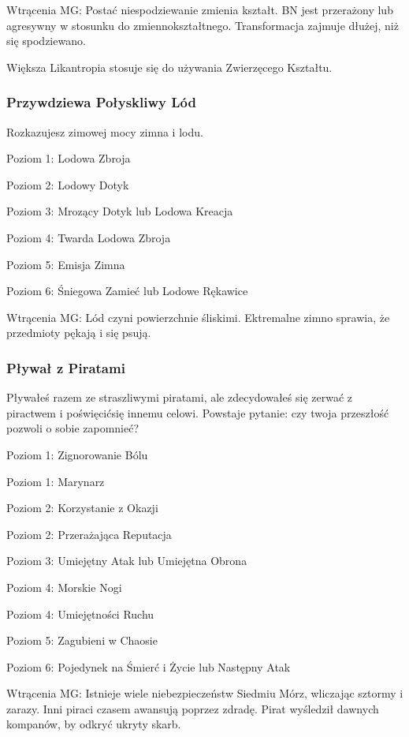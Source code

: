 Wtrącenia MG: Postać niespodziewanie zmienia kształt. BN jest przerażony lub agresywny w stosunku do zmiennokształtnego. Transformacja zajmuje dłużej, niż się spodziewano.

Większa Likantropia stosuje się do używania Zwierzęcego Kształtu.

\subsubsection{Przywdziewa Połyskliwy Lód}

Rozkazujesz zimowej mocy zimna i lodu.

Poziom 1: Lodowa Zbroja

Poziom 2: Lodowy Dotyk

Poziom 3: Mrozący Dotyk lub Lodowa Kreacja

Poziom 4: Twarda Lodowa Zbroja

Poziom 5: Emisja Zimna

Poziom 6: Śniegowa Zamieć lub Lodowe Rękawice

Wtrącenia MG: Lód czyni powierzchnie śliskimi. Ektremalne zimno sprawia, że przedmioty pękają i się psują. 

\subsubsection{Pływał z Piratami}

Pływałeś razem ze straszliwymi piratami, ale zdecydowałeś się zerwać z piractwem i poświęcićsię innemu celowi. Powstaje pytanie: czy twoja przeszłość pozwoli o sobie zapomnieć?

Poziom 1: Zignorowanie Bólu

Poziom 1: Marynarz

Poziom 2: Korzystanie z Okazji

Poziom 2: Przerażająca Reputacja

Poziom 3: Umiejętny Atak lub Umiejętna Obrona

Poziom 4: Morskie Nogi

Poziom 4: Umiejętności Ruchu

Poziom 5: Zagubieni w Chaosie

Poziom 6: Pojedynek na Śmierć i Życie lub Następny Atak

Wtrącenia MG: Istnieje wiele niebezpieczeństw Siedmiu Mórz, wliczając sztormy i zarazy. Inni piraci czasem awansują poprzez zdradę. Pirat wyśledził dawnych kompanów, by odkryć ukryty skarb.

